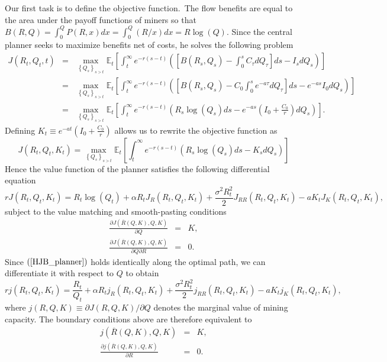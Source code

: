 \documentclass[12pt, a4paper]{article}
\begin{document}
Our first task is to define the objective function.\ The flow benefits are
equal to the area under the payoff functions of miners so that $B\left(
R,Q\right) =\int_{0}^{Q}P\left( R,x\right) dx=\int_{0}^{Q}\left( R/x\right)
dx=R\log (Q)$. Since the central planner seeks to maximize benefits net of
costs, he solves the following problem%
\begin{eqnarray*}
J\left( R_{t},Q_{t},t\right)  &=&\max_{\left\{ Q_{s}\right\} _{s>t}}\mathbb{E%
}_{t}\left[ \int_{t}^{\infty }e^{-r(s-t)}\left( \left[ B\left(
R_{s},Q_{s}\right) -\int_{0}^{s}C_{\tau }dQ_{\tau }\right]
ds-I_{s}dQ_{s}\right) \right]  \\
&=&\max_{\left\{ Q_{s}\right\} _{s>t}}\mathbb{E}_{t}\left[ \int_{t}^{\infty
}e^{-r(s-t)}\left( \left[ B\left( R_{s},Q_{s}\right)
-C_{0}\int_{0}^{s}e^{-a\tau }dQ_{\tau }\right] ds-e^{-as}I_{0}dQ_{s}\right) %
\right]  \\
&=&\max_{\left\{ Q_{s}\right\} _{s>t}}\mathbb{E}_{t}\left[ \int_{t}^{\infty
}e^{-r(s-t)}\left( R_{s}\log (Q_{s})ds-e^{-as}\left( I_{0}+\frac{C_{0}}{r}%
\right) dQ_{s}\right) \right] .
\end{eqnarray*}%
Defining $K_{t}\equiv e^{-at}\left( I_{0}+\frac{C_{0}}{r}\right) $ allows us
to rewrite the objective function as%
\begin{equation*}
J\left( R_{t},Q_{t},K_{t}\right) =\max_{\left\{ Q_{s}\right\} _{s>t}}\mathbb{E}_{t}
\left[ \int_{t}^{\infty }e^{-r(s-t)}\left( R_{s}\log
(Q_{s})ds-K_{s}dQ_{s}\right) \right]
\end{equation*}%
Hence the value function of the planner satisfies the following differential
equation%
{ \scriptsize
\begin{equation}
rJ\left( R_{t},Q_{t},K_{t}\right) =R_{t}\log (Q_{t})+\alpha R_{t}J_{R}\left(
R_{t},Q_{t},K_{t}\right) +\frac{\sigma ^{2}R_{t}^{2}}{2}J_{RR}\left(
R_{t},Q_{t},K_{t}\right) -aK_{t}J_{K}\left( R_{t},Q_{t},K_{t}\right) ,
\label{HJB_planner}
\end{equation}
}%
subject to the value matching and smooth-pasting conditions%
\begin{eqnarray*}
\frac{\partial J\left( \overline{R}(Q,K),Q,K\right) }{\partial Q} &=&K, \\
\frac{\partial J\left( \overline{R}(Q,K),Q,K\right) }{\partial Q\partial R}
&=&0.
\end{eqnarray*}%
Since $\left( \ref{HJB_planner}\right) $ holds identically along the
optimal path, we can differentiate it with respect to $Q$ to obtain%
\begin{equation*}
rj\left( R_{t},Q_{t},K_{t}\right) =\frac{R_{t}}{Q_{t}}+\alpha
R_{t}j_{R}\left( R_{t},Q_{t},K_{t}\right) +\frac{\sigma ^{2}R_{t}^{2}}{2}%
j_{RR}\left( R_{t},Q_{t},K_{t}\right) -aK_{t}j_{K}\left(
R_{t},Q_{t},K_{t}\right) ,
\end{equation*}%
where $j\left( R,Q,K\right) \equiv \partial J\left( R,Q,K\right) /\partial Q$
denotes the marginal value of mining capacity. The boundary conditions
above are therefore equivalent to%
\begin{eqnarray*}
j\left( \overline{R}(Q,K),Q,K\right)  &=&K, \\
\frac{\partial j\left( \overline{R}(Q,K),Q,K\right) }{\partial R} &=&0.
\end{eqnarray*}
\end{document}
